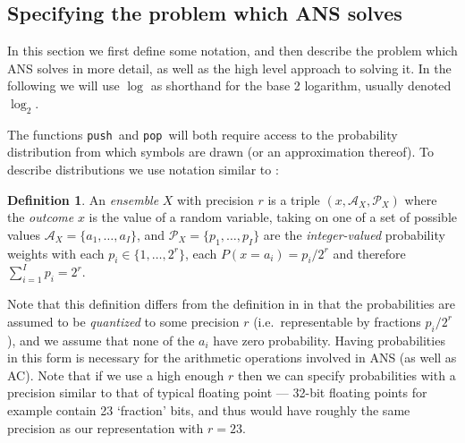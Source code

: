 \documentclass{article}
\theoremstyle{definition}
\newtheorem{definition}{Definition}
\newcommand{\push}{\texttt{push}}
\newcommand{\pop}{\texttt{pop}}
\begin{document}
\subsection{Specifying the problem which ANS solves}\label{sec:prob-spec}
  In this section we first define some notation, and then describe the problem
  which ANS solves in more detail, as well as the high level approach to
  solving it. In the following we will use \(\log\) as shorthand for the base 2
  logarithm, usually denoted \(\log_2\).

  The functions \push\ and \pop\ will both require access to the probability
  distribution from which symbols are drawn (or an approximation thereof). To
  describe distributions we use notation similar to \citet{mackay2003}:
  \begin{definition}\label{def:ensemble}
    An \emph{ensemble} \(X\) with precision \(r\) is a triple \((x,
    \mathcal{A}_X, \mathcal{P}_X)\) where the \emph{outcome} \(x\) is the value
    of a random variable, taking on one of a set of possible values
    \(\mathcal{A}_X = \{a_1, \ldots, a_I\}\), and \(\mathcal{P}_X = \{p_1,
    \ldots, p_I\}\) are the \emph{integer-valued} probability weights with each
    \(p_i\in\{1, \ldots, 2^r\}\), each \(P(x=a_i) = p_i / 2^r\) and therefore
    \(\sum_{i=1}^Ip_i = 2^r\).
  \end{definition}
  Note that this definition differs from the definition in \citet{mackay2003}
  in that the probabilities are assumed to be \emph{quantized}  to some
  precision \(r\) (i.e.\ representable by fractions \(p_i/2^r\)), and we assume
  that none of the \(a_i\) have zero probability. Having probabilities in this
  form is necessary for the arithmetic operations involved in ANS (as well as
  AC). Note that if we use a high enough \(r\) then we can specify
  probabilities with a precision similar to that of typical floating point ---
  32-bit floating points for example contain 23 `fraction' bits, and thus would
  have roughly the same precision as our representation with \(r=23\).
\end{document}
